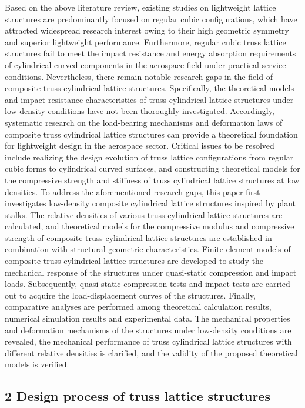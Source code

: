 \documentclass{article} %
\begin{document}
Based on the above literature review, existing studies on lightweight lattice structures are predominantly focused on regular cubic configurations, which have attracted widespread research interest owing to their high geometric symmetry and superior lightweight performance. Furthermore, regular cubic truss lattice structures fail to meet the impact resistance and energy absorption requirements of cylindrical curved components in the aerospace field under practical service conditions. Nevertheless, there remain notable research gaps in the field of composite truss cylindrical lattice structures. Specifically, the theoretical models and impact resistance characteristics of truss cylindrical lattice structures under low-density conditions have not been thoroughly investigated. Accordingly, systematic research on the load-bearing mechanisms and deformation laws of composite truss cylindrical lattice structures can provide a theoretical foundation for lightweight design in the aerospace sector. Critical issues to be resolved include realizing the design evolution of truss lattice configurations from regular cubic forms to cylindrical curved surfaces, and constructing theoretical models for the compressive strength and stiffness of truss cylindrical lattice structures at low densities. To address the aforementioned research gaps, this paper first investigates low-density composite cylindrical lattice structures inspired by plant stalks. The relative densities of various truss cylindrical lattice structures are calculated, and theoretical models for the compressive modulus and compressive strength of composite truss cylindrical lattice structures are established in combination with structural geometric characteristics. Finite element models of composite truss cylindrical lattice structures are developed to study the mechanical response of the structures under quasi-static compression and impact loads. Subsequently, quasi-static compression tests and impact tests are carried out to acquire the load-displacement curves of the structures. Finally, comparative analyses are performed among theoretical calculation results, numerical simulation results and experimental data. The mechanical properties and deformation mechanisms of the structures under low-density conditions are revealed, the mechanical performance of truss cylindrical lattice structures with different relative densities is clarified, and the validity of the proposed theoretical models is verified.

\noindent 
\subsection{2  Design process of truss lattice structures}
\end{document}
